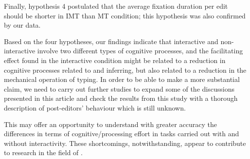 \documentclass[output=paper]{langsci/langscibook}
\begin{document}
Finally, hypothesis 4 postulated that the average fixation duration per edit should be shorter in IMT than MT condition; this hypothesis was also confirmed by our data. 



Based on the four hypotheses, our findings indicate that interactive and non-interactive  involve two different types of cognitive processes, and the facilitating effect found in the interactive condition might be related to a reduction in cognitive processes related to  and inferring, but also related to a reduction in the mechanical operation of typing. In order to be able to make a more substantial claim, we need to carry out further studies to expand some of the discussions presented in this article and check the results from this study with a thorough description of post-editors' behaviour which is still unknown.  



This may offer an opportunity to understand with greater accuracy the differences in terms of cognitive/processing effort in  tasks carried out with and without interactivity. These shortcomings, notwithstanding, appear to contribute to research in the field of .
\end{document}
